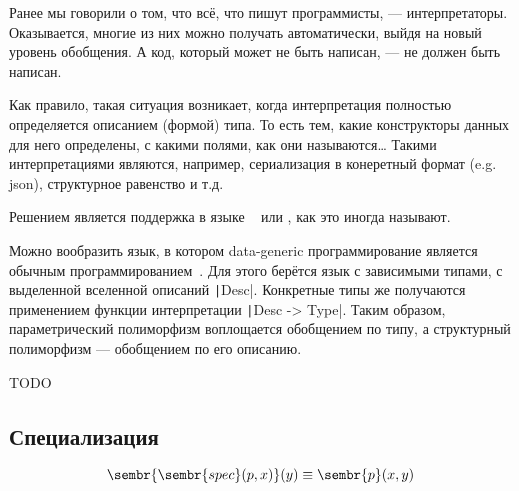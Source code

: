 
Ранее мы говорили о том, что всё, что пишут программисты, --- интерпретаторы.
Оказывается, многие из них можно получать автоматически, выйдя на новый уровень обобщения.
А код, который может не быть написан, --- не должен быть написан.

Как правило, такая ситуация возникает, когда интерпретация полностью определяется описанием (формой) типа.
То есть тем, какие конструкторы данных для него определены, с какими полями, как они называются\ldots
Такими интерпретациями являются, например, сериализация в конеретный формат (e.g. json), структурное равенство и т.д.

Решением является поддержка в языке  ~\cite[глава 13]{maguire-types} или , как это иногда называют.


Можно вообразить язык, в котором data-generic программирование является обычным программированием~\cite{chapman2010gentle}.
Для этого берётся язык с зависимыми типами, с выделенной вселенной описаний \texttt|Desc|.
Конкретные типы же получаются применением функции интерпретации \texttt|Desc -> Type|.
Таким образом, параметрический полиморфизм воплощается обобщением по типу, а структурный полиморфизм --- обобщением по его описанию.



TODO %

\subsection{Специализация}

\[
    \sembr{\sembr{spec}(p, x)}(y) \equiv \sembr{p}(x, y)
\]








